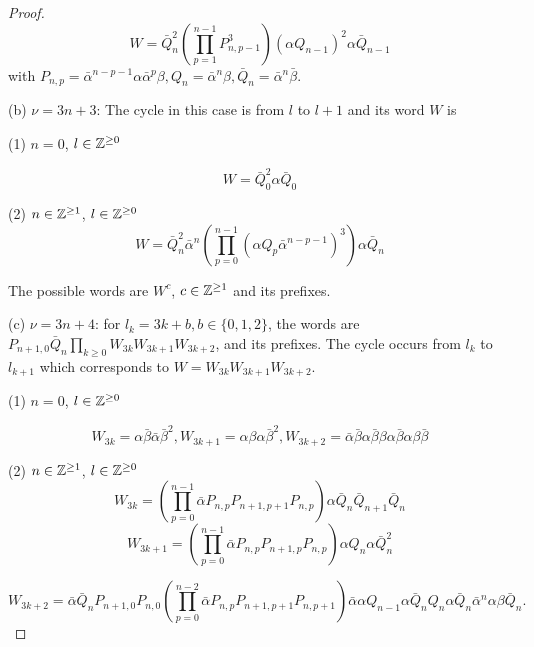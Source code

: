 \documentclass[10pt,a4paper]{amsart}
\begin{document}
\begin{proof}
  \begin{equation} 
 W=\bar{Q}_{n}^{2}\left(\prod^{n-1} _{p=1}P_{n, p-1}^{3}\right) (\alpha Q_{n-1})^{2} \alpha \bar{Q}_{n-1}
           \end{equation} 
with $P_{n,p}=\bar{\alpha}^{n-p-1}\alpha \bar{\alpha}^{p} \beta, Q_{n}= \bar{\alpha}^{n}\beta, \bar{Q}_{n}= \bar{\alpha}^{n}\bar{\beta}$.
     \bigskip\par 
 
(b) $\nu= 3n+3$: The cycle in this case is from $l$ to $l+1$ and its word $W$ is 
      \bigskip\par 
(1) $n =0$, $l \in  {\Bbb{Z}}^{\geq 0}$

      \begin{equation} 
W=  \bar{Q}_{0}^{2}  \alpha \bar{Q}_{0}
          \end{equation}  

(2) $n \in  {\Bbb{Z}}^{\geq 1}$, $l \in  {\Bbb{Z}}^{\geq 0}$
      \begin{equation} 
W=  \bar{Q}_{n}^{2} \bar\alpha^{n} \left( \prod^{n-1} _{p=0}( \alpha {Q}_{p } \bar\alpha^{n-p -1})^{3}\right) \alpha  \bar{Q}_{n}
          \end{equation}  

 The possible words are $W^{c}$, $c \in  {\Bbb{Z}}^{\geq 1}$ and its prefixes.
      \bigskip\par 

(c) $\nu= 3n+4$:  for $l_{k}=3k+b, b\in \{ 0, 1, 2 \}$, the  words  are  $P_{n+1,0} \bar{Q}_{n} \prod _{k \geq 0} W_{3k}W_{3k+1}W_{3k+2}$, and its prefixes. The cycle occurs from $l_{k}$ to $l_{k+1}$ which corresponds to  $W=W_{3k}W_{3k+1}W_{3k+2}$.
      \bigskip\par 
(1) $n =0$, $l \in  {\Bbb{Z}}^{\geq 0}$

   \begin{equation} 
  W_{3k}=\alpha\bar{\beta}\bar{\alpha}\bar{\beta}^2, W_{3k+1}=\alpha\beta\alpha\bar{\beta}^2, W_{3k+2}=\bar{\alpha}\bar{\beta}\alpha\bar{\beta}\beta\alpha\bar{\beta}\alpha\beta\bar{\beta}
           \end{equation} 

(2) $n \in  {\Bbb{Z}}^{\geq 1}$, $l \in  {\Bbb{Z}}^{\geq 0}$
    \begin{equation} 
  W_{3k}=\left(\prod^{n-1} _{p=0} \bar{\alpha}P_{n,p}P_{n+1,p+1}P_{n,p}\right)\alpha\bar{Q}_{n}\bar{Q}_{n+1} \bar{Q}_{n}  
           \end{equation} 
  \begin{equation} 
W_{3k+1}=\left(\prod^{n-1} _{p=0} \bar{\alpha}P_{n,p}P_{n+1,p}P_{n,p}\right)\alpha Q_{n}  \alpha  \bar{Q}_{n}^{2}
         \end{equation}  
  
      \begin{equation} 
    W_{3k+2}=\bar{\alpha}  \bar{Q}_{n} P_{n+1,0}P_{n,0}\left(\prod^{n-2} _{p=0} \bar{\alpha}P_{n,p}P_{n+1,p+1}P_{n,p+1}\right)\bar{\alpha} \alpha Q_{n-1} \alpha 
    \bar{Q}_{n}Q_{n}\alpha\bar{Q}_{n}\bar{\alpha}^{n} \alpha \beta \bar{Q}_{n}.
             \end{equation}  
 
  \end{proof}
\end{document}
